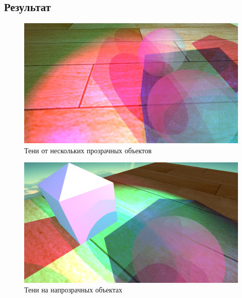 \documentclass[12pt, a4paper] {ncc}
\begin{document}
\newpage
	\subsection{Результат}
	
		\begin{figure}[ht]
        	\includegraphics[scale=0.3]{./shadow_tr1.png}
    		\caption{Тени от нескольких прозрачных объектов}
		\end{figure}

		\begin{figure}[ht]
        	\includegraphics[scale=0.3]{./shadow_tr2.png}
    		\caption{Тени на напрозрачных объектах}
		\end{figure}
\end{document}
